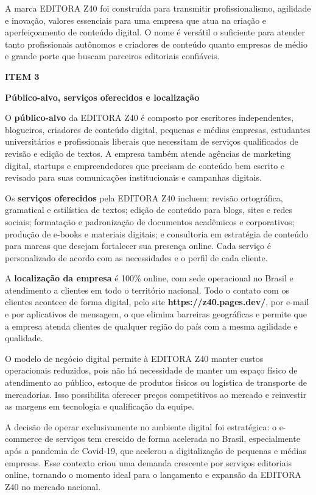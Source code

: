 \documentclass[10pt,a4paper]{article}
\newcommand{\zsiteplain}{https://\allowbreak{}z40.pages\allowbreak{}.dev/\allowbreak{}}
\newcommand{\zsite}{\textbf{\zsiteplain}}
\newcommand{\labelfont}{\fontsize{5.8}{7.5}\selectfont\bfseries\addfontfeatures{LetterSpace=15}}
\newcommand{\headingfont}{\fontsize{9.8}{12}\selectfont\bfseries\color{navy}}
\newcommand{\separador}{\vspace{16pt}{\color{rulegray}\rule{\linewidth}{0.6pt}}\vspace{10pt}}
\newcommand{\itemh}[2]{\needspace{6\baselineskip}%
  {\labelfont\color{graylab}ITEM #1}\par\vspace{5pt}%
  {\headingfont #2}\par\vspace{8pt}}
\begin{document}
A marca EDITORA Z40 foi construída para transmitir profissionalismo, agilidade e inovação, valores essenciais para uma empresa que atua na criação e aperfeiçoamento de conteúdo digital. O nome é versátil o suficiente para atender tanto profissionais autônomos e criadores de conteúdo quanto empresas de médio e grande porte que buscam parceiros editoriais confiáveis.

\separador
\itemh{3}{Público-alvo, serviços oferecidos e localização}

O \textbf{público-alvo} da EDITORA Z40 é composto por escritores independentes, blogueiros, criadores de conteúdo digital, pequenas e médias empresas, estudantes universitários e profissionais liberais que necessitam de serviços qualificados de revisão e edição de textos. A empresa também atende agências de marketing digital, startups e empreendedores que precisam de conteúdo bem escrito e revisado para suas comunicações institucionais e campanhas digitais.

Os \textbf{serviços oferecidos} pela EDITORA Z40 incluem: revisão ortográfica, gramatical e estilística de textos; edição de conteúdo para blogs, sites e redes sociais; formatação e padronização de documentos acadêmicos e corporativos; produção de e-books e materiais digitais; e consultoria em estratégia de conteúdo para marcas que desejam fortalecer sua presença online. Cada serviço é personalizado de acordo com as necessidades e o perfil de cada cliente.

A \textbf{localização da empresa} é 100\% online, com sede operacional no Brasil e atendimento a clientes em todo o território nacional. Todo o contato com os clientes acontece de forma digital, pelo site \zsite, por e-mail e por aplicativos de mensagem, o que elimina barreiras geográficas e permite que a empresa atenda clientes de qualquer região do país com a mesma agilidade e qualidade.

O modelo de negócio digital permite à EDITORA Z40 manter custos operacionais reduzidos, pois não há necessidade de manter um espaço físico de atendimento ao público, estoque de produtos físicos ou logística de transporte de mercadorias. Isso possibilita oferecer preços competitivos ao mercado e reinvestir as margens em tecnologia e qualificação da equipe.

A decisão de operar exclusivamente no ambiente digital foi estratégica: o e-commerce de serviços tem crescido de forma acelerada no Brasil, especialmente após a pandemia de Covid-19, que acelerou a digitalização de pequenas e médias empresas. Esse contexto criou uma demanda crescente por serviços editoriais online, tornando o momento ideal para o lançamento e expansão da EDITORA Z40 no mercado nacional.
\end{document}
